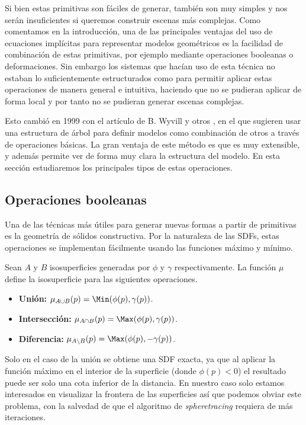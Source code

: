 
Si bien estas primitivas son fáciles de generar, también son muy simples y nos serán insuficientes si queremos construir escenas más complejas. Como comentamos en la introducción, una de las principales ventajas del uso de ecuaciones implícitas para representar modelos geométricos es la facilidad de combinación de estas primitivas, por ejemplo mediante operaciones booleanas o deformaciones. Sin embargo los sistemas que hacían uso de esta técnica no estaban lo suficientemente estructurados como para permitir aplicar estas operaciones de manera general e intuitiva, haciendo que no se pudieran aplicar de forma local y por tanto no se pudieran generar escenas complejas.\newline


Esto cambió en 1999 con el artículo de B. Wyvill y otros \cite{blobtree}, en el que sugieren usar una estructura de árbol para definir modelos como combinación de otros a través de operaciones básicas. La gran ventaja de este método es que es muy extensible, y además permite ver de forma muy clara la estructura del modelo. En esta sección estudiaremos los principales tipos de estas operaciones.

\subsection{Operaciones booleanas}\label{sec:boolean}
Una de las técnicas más útiles para generar nuevas formas a partir de primitivas es la geometría de sólidos constructiva. Por la naturaleza de las SDFs, estas operaciones se implementan fácilmente usando las funciones máximo y mínimo.

\begin{definicion}\label{p:boolean}
    Sean $A$ y $B$ isosuperficies generadas por $\phi$ y $\gamma$ respectivamente. La función $\mu$ define la isosuperficie para las siguientes operaciones.
    \begin{itemize}
        \item \textbf{Unión: } $\mu_{A\cup B}(p) = \Min(\phi(p), \gamma(p))$.
        \item \textbf{Intersección: } $\mu_{A\cap B}(p) = \Max(\phi(p), \gamma(p))$.
        \item \textbf{Diferencia: } $\mu_{A\setminus B}(p) = \Max(\phi(p), -\gamma(p))$.
    \end{itemize}
\end{definicion}

Solo en el caso de la unión se obtiene una SDF exacta, ya que al aplicar la función máximo en el interior de la superficie (donde $\phi(p) < 0$) el resultado puede ser solo una cota inferior de la distancia. En nuestro caso solo estamos interesados en visualizar la frontera de las superficies así que podemos obviar este problema, con la salvedad de que el algoritmo de \textit{spheretracing} requiera de más iteraciones.\newline

